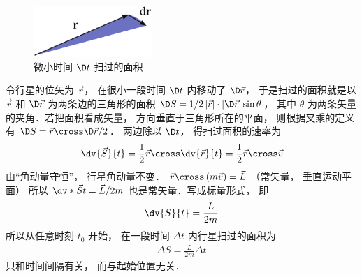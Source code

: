 
\begin{figure}[ht]
\centering
\includegraphics[width=4.5cm]{./figures/Keple21.pdf}
\caption{微小时间 $\D t$ 扫过的面积} \label{Keple21}
\end{figure}

令行星的位矢为 $\vec r$，  在很小一段时间 $\D t$ 内移动了 $\D \vec r$，  于是扫过的面积就是以 $\vec r$ 和 $\D \vec r$ 为两条边的三角形的面积 $\D S = {1}/{2}\left| {\vec r} \right| \cdot \left| {\D \vec r} \right|\sin \theta $，  其中 $\theta $ 为两条矢量的夹角．若把面积看成矢量， 方向垂直于三角形所在的平面， 则根据叉乘的定义有 $\D \vec S = \vec r \cross \D \vec r/2$． 两边除以 $\D t$，  得扫过面积的速率为
\begin{equation}
\dv{\vec S}{t} = \frac{1}{2}\vec r \cross \dv{\vec r}{t} = \frac 12 \vec r\cross \vec v
\end{equation}
由“角动量守恒”， 行星角动量不变．
$\vec r \cross \left( {m\vec v} \right) = \vec L$ （常矢量， 垂直运动平面） 所以 $\dv*{\vec S}{t} = {{\vec L}}/{{2m}}$ 也是常矢量．写成标量形式， 即
\begin{equation}
\dv{S}{t} = \frac{L}{{2m}}
\end{equation}
所以从任意时刻 ${t_0}$ 开始， 在一段时间 $\Delta t$ 内行星扫过的面积为 
\begin{equation}
\begin{aligned}
\Delta S = \frac{L}{{2m}}\Delta t
\end{aligned}
\end{equation}
只和时间间隔有关， 而与起始位置无关．

